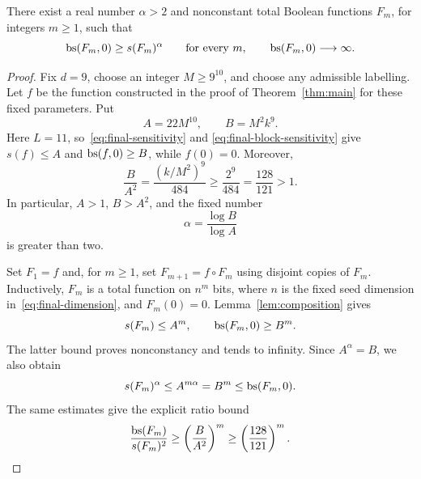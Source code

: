 \begin{corollary}
\label{cor:power-separation}
There exist a real number $\alpha>2$ and nonconstant total Boolean
functions $F_m$, for integers $m\geq1$, such that
\[
 \operatorname{bs}(F_m,0)\geq s(F_m)^\alpha
 \qquad\text{for every }m,
 \qquad
 \operatorname{bs}(F_m,0)\longrightarrow\infty.
\]
\end{corollary}

\begin{proof}
Fix $d=9$, choose an integer $M\geq9^{10}$, and choose any admissible
labelling. Let $f$ be the function constructed in the proof of
Theorem~\ref{thm:main} for these fixed parameters. Put
\[
 A=22M^{10},\qquad B=M^2k^9.
\]
Here $L=11$, so~\eqref{eq:final-sensitivity} and
\eqref{eq:final-block-sensitivity} give
$s(f)\leq A$ and $\operatorname{bs}(f,0)\geq B$, while $f(0)=0$.
Moreover,
\[
 \frac{B}{A^2}
   =\frac{(k/M^2)^9}{484}
   \geq\frac{2^9}{484}
   =\frac{128}{121}>1.
\]
In particular, $A>1$, $B>A^2$, and the fixed number
\[
 \alpha=\frac{\log B}{\log A}
\]
is greater than two.

Set $F_1=f$ and, for $m\geq1$, set $F_{m+1}=f\circ F_m$ using disjoint
copies of $F_m$. Inductively, $F_m$ is a total function on $n^m$ bits,
where $n$ is the fixed seed dimension in~\eqref{eq:final-dimension},
and $F_m(0)=0$.
Lemma~\ref{lem:composition} gives
\[
 s(F_m)\leq A^m,
 \qquad
 \operatorname{bs}(F_m,0)\geq B^m.
\]
The latter bound proves nonconstancy and tends to infinity. Since
$A^\alpha=B$, we also obtain
\[
 s(F_m)^\alpha\leq A^{m\alpha}=B^m\leq\operatorname{bs}(F_m,0).
\]
The same estimates give the explicit ratio bound
\[
 \frac{\operatorname{bs}(F_m)}{s(F_m)^2}
 \geq\left(\frac{B}{A^2}\right)^m
 \geq\left(\frac{128}{121}\right)^m.\qedhere
\]
\end{proof}
